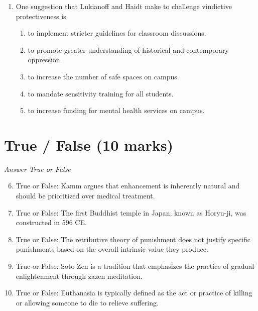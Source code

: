 \documentclass[12pt]{article}
\begin{document}
\begin{enumerate}[label=\arabic*.]
\begin{enumerate}[label=(\alph*)]
    \item it is impossible for humans to judge what is holy.
    \item there are many other things that are also holy.
    \item the concept of 'wrongdoing' is too subjective to define holiness.
    \item only gods can decide who the wrongdoers are.
    \item Euthyphro is not a reliable authority on what is holy.
\end{enumerate}
\item One suggestion that Lukianoff and Haidt make to challenge vindictive protectiveness is
\begin{enumerate}[label=(\alph*)]
    \item to implement stricter guidelines for classroom discussions.
    \item to promote greater understanding of historical and contemporary oppression.
    \item to increase the number of safe spaces on campus.
    \item to mandate sensitivity training for all students.
    \item to increase funding for mental health services on campus.
\end{enumerate}
\end{enumerate}

\section*{True / False (10 marks)}
\textit{Answer True or False}
\begin{enumerate}[label=\arabic*.]
\setcounter{enumi}{5}
\item True or False: Kamm argues that enhancement is inherently natural and should be prioritized over medical treatment.
\item True or False: The first Buddhist temple in Japan, known as Horyu-ji, was constructed in 596 CE.
\item True or False: The retributive theory of punishment does not justify specific punishments based on the overall intrinsic value they produce.
\item True or False: Soto Zen is a tradition that emphasizes the practice of gradual enlightenment through zazen meditation.
\item True or False: Euthanasia is typically defined as the act or practice of killing or allowing someone to die to relieve suffering.
\end{enumerate}
\end{document}
